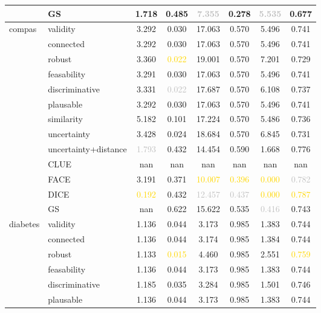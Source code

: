 \begin{table}[ht]
\begin{tabular}{l l c c c c c c}
 & GS & \textcolor{bronze}{1.718} & 0.485 & \textcolor{silver}{7.355} & \textcolor{bronze}{0.278} & \textcolor{silver}{5.535} & 0.677 \\
\hline
\multirow{13}{*}{compas} & validity & 3.292 & 0.030 & 17.063 & 0.570 & 5.496 & 0.741 \\
 & connected & 3.292 & 0.030 & 17.063 & 0.570 & 5.496 & 0.741 \\
 & robust & 3.360 & \textcolor{gold}{0.022} & 19.001 & 0.570 & 7.201 & 0.729 \\
 & feasability & 3.291 & 0.030 & 17.063 & 0.570 & 5.496 & 0.741 \\
 & discriminative & 3.331 & \textcolor{silver}{0.022} & 17.687 & 0.570 & 6.108 & 0.737 \\
 & plausable & 3.292 & 0.030 & 17.063 & 0.570 & 5.496 & 0.741 \\
 & similarity & 5.182 & 0.101 & 17.224 & 0.570 & 5.486 & 0.736 \\
 & uncertainty & 3.428 & \textcolor{bronze}{0.024} & 18.684 & 0.570 & 6.845 & 0.731 \\
 & uncertainty+distance & \textcolor{silver}{1.793} & 0.432 & \textcolor{bronze}{14.454} & 0.590 & \textcolor{bronze}{1.668} & \textcolor{bronze}{0.776} \\
 & CLUE & nan & nan & nan & nan & nan & nan \\
 & FACE & \textcolor{bronze}{3.191} & 0.371 & \textcolor{gold}{10.007} & \textcolor{gold}{0.396} & \textcolor{gold}{0.000} & \textcolor{silver}{0.782} \\
 & DICE & \textcolor{gold}{0.192} & 0.432 & \textcolor{silver}{12.457} & \textcolor{silver}{0.437} & \textcolor{gold}{0.000} & \textcolor{gold}{0.787} \\
 & GS & nan & 0.622 & 15.622 & \textcolor{bronze}{0.535} & \textcolor{silver}{0.416} & 0.743 \\
\hline
\multirow{13}{*}{diabetes} & validity & 1.136 & 0.044 & 3.173 & 0.985 & 1.383 & 0.744 \\
 & connected & 1.136 & 0.044 & 3.174 & 0.985 & 1.384 & 0.744 \\
 & robust & 1.133 & \textcolor{gold}{0.015} & 4.460 & 0.985 & 2.551 & \textcolor{gold}{0.759} \\
 & feasability & 1.136 & 0.044 & 3.173 & 0.985 & 1.383 & 0.744 \\
 & discriminative & 1.185 & \textcolor{bronze}{0.035} & 3.284 & 0.985 & 1.501 & 0.746 \\
 & plausable & 1.136 & 0.044 & 3.173 & 0.985 & 1.383 & 0.744 \\

\end{tabular}
\end{table}
